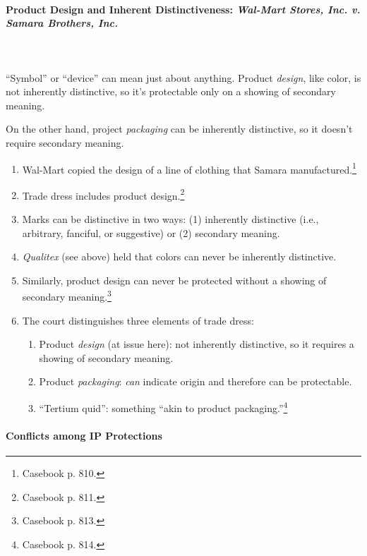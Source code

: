 \paragraph{Product Design and Inherent Distinctiveness: \emph{Wal-Mart Stores, 
Inc. v. Samara Brothers, Inc.}}
~\\\\
``Symbol'' or ``device'' can mean just about anything. Product \emph{design}, 
like color, is not inherently distinctive, so it's protectable only on a 
showing of secondary meaning.

On the other hand, project \emph{packaging} can be inherently distinctive, so 
it doesn't require secondary meaning.

\begin{enumerate}
    \item Wal-Mart copied the design of a line of clothing that Samara 
    manufactured.\footnote{Casebook p. 810.}
    \item Trade dress includes product design.\footnote{Casebook p. 811.}
    \item Marks can be distinctive in two ways: (1) inherently distinctive 
    (i.e., arbitrary, fanciful, or suggestive) or (2) secondary meaning.
    \item \emph{Qualitex} (see above) held that colors can never be inherently 
    distinctive.
    \item Similarly, product design can never be protected without a showing 
    of secondary meaning.\footnote{Casebook p. 813.}
    \item The court distinguishes three elements of trade dress:
    \begin{enumerate}
        \item Product \emph{design} (at issue here): not inherently 
        distinctive, so it requires a showing of secondary meaning.
        \item Product \emph{packaging}: \emph{can} indicate origin and 
        therefore can be protectable.
        \item ``Tertium quid'': something ``akin to product 
        packaging.''\footnote{Casebook p. 814.}
    \end{enumerate}
\end{enumerate}

\paragraph{Conflicts among IP Protections}

